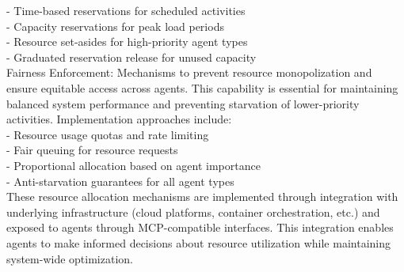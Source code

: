 - Time-based reservations for scheduled activities\\ \newline
- Capacity reservations for peak load periods\\ \newline
- Resource set-asides for high-priority agent types\\ \newline
- Graduated reservation release for unused capacity\\ \newline
Fairness Enforcement: Mechanisms to prevent resource monopolization and ensure equitable access across agents. This capability is essential for maintaining balanced system performance and preventing starvation of lower-priority activities. Implementation approaches include:\\ \newline
- Resource usage quotas and rate limiting\\ \newline
- Fair queuing for resource requests\\ \newline
- Proportional allocation based on agent importance\\ \newline
- Anti-starvation guarantees for all agent types\\ \newline
These resource allocation mechanisms are implemented through integration with underlying infrastructure (cloud platforms, container orchestration, etc.) and exposed to agents through MCP-compatible interfaces. This integration enables agents to make informed decisions about resource utilization while maintaining system-wide optimization.\\
